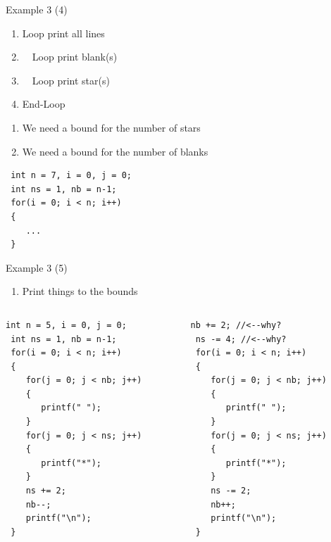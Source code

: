 \begin{frame}[fragile]{Example 3 (4)}
\begin{enumerate}
	\item {Loop print all lines}
	\item {~~Loop print blank(s)}
	\item {~~Loop print star(s)}
	\item {End-Loop}
\end{enumerate}
\begin{enumerate}
	\item {We need a bound for the number of stars}
	\item {We need a bound for the number of blanks}
\end{enumerate}
\begin{lstlisting}
 int n = 7, i = 0, j = 0;
 int ns = 1, nb = n-1;
 for(i = 0; i < n; i++)
 {
    ...
 }
\end{lstlisting}
\end{frame}

\begin{frame}[fragile]{Example 3 (5)}
\begin{enumerate}
	\item {Print things to the bounds}
\end{enumerate}
\vspace{-0.1in}
\begin{columns}
\begin{column}{0.49\linewidth}
\begin{lstlisting}[numbers=none]
 int n = 5, i = 0, j = 0;
 int ns = 1, nb = n-1;
 for(i = 0; i < n; i++)
 {
    for(j = 0; j < nb; j++)
    {
       printf(" ");
    }
    for(j = 0; j < ns; j++)
    {
       printf("*");
    }
    ns += 2;
    nb--;
    printf("\n");
 }
\end{lstlisting}
\end{column}
\begin{column}{0.49\linewidth}
\begin{lstlisting}[numbers=none]
 nb += 2; //<--why?
 ns -= 4; //<--why?
 for(i = 0; i < n; i++)
 {
    for(j = 0; j < nb; j++)
    {
       printf(" ");
    }
    for(j = 0; j < ns; j++)
    {
       printf("*");
    }
    ns -= 2;
    nb++;
    printf("\n");
 }
\end{lstlisting}
\end{column}
\end{columns}
\end{frame}


